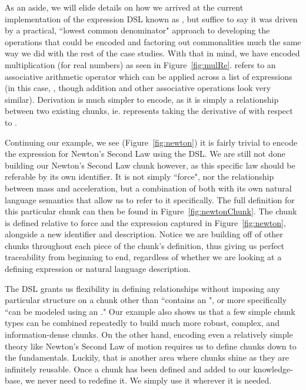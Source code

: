
As an aside, we will elide details on how we arrived at the current 
implementation of the expression DSL known as , but suffice to say 
it was driven by a practical, ``lowest common denominator" approach to 
developing the operations that could be encoded and factoring out commonalities 
much the same way we did with the rest of the case studies. With that in mind, 
we have encoded multiplication (for real numbers) as seen in 
Figure~\ref{fig:mulRe}.  refers to an associative arithmetic 
operator which can be applied across a list of expressions (in this case, 
, though addition and other associative operations look very 
similar). Derivation is much simpler to encode, as it is simply a relationship 
between two existing chunks, ie.  represents taking the 
derivative of  with respect to .


Continuing our example, we see (Figure~\ref{fig:newton}) it is fairly trivial 
to encode the expression for Newton's Second Law using the  DSL. We 
are still not done building our Newton's Second Law chunk however, as this 
specific law should be referable by its own identifier. It is not simply 
``force", nor the relationship between mass and acceleration, but a combination 
of both with its own natural language semantics that allow us to refer to it 
specifically. The full definition for this particular chunk can then be found 
in Figure~\ref{fig:newtonChunk}. The chunk is defined relative to force and the 
expression captured in Figure~\ref{fig:newton}, alongside a new identifier and 
description. Notice we are building off of other chunks throughout each piece 
of the chunk's definition, thus giving us perfect traceability from beginning 
to end, regardless of whether we are looking at a defining expression or 
natural language description.


The  DSL grants us flexibility in defining relationships without 
imposing any particular structure on a chunk other than ``contains an 
", or more specifically ``can be modeled using an ." 
Our example also shows us that a few simple chunk types can be combined 
repeatedly to build much more robust, complex, and information-dense chunks. On 
the other hand, encoding even a relatively simple theory like Newton's Second 
Law of motion requires us to define chunks down to the fundamentals. 
Luckily, that is another area where chunks shine as they are infinitely 
reusable. Once a chunk has been defined and added to our knowledge-base, we 
never need to redefine it. We simply use it wherever it is needed.

